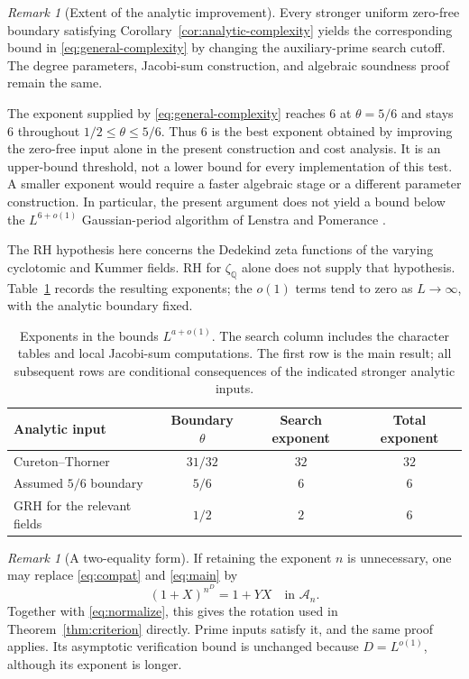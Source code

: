 \documentclass[11pt]{article}
\theoremstyle{definition}
\theoremstyle{remark}
\newtheorem{remark}[theorem]{Remark}
\newcommand{\Q}{\mathbb Q}
\newcommand{\A}{\mathcal A}
\begin{document}
\begin{remark}[Extent of the analytic improvement]\label{rem:analytic-limit}
Every stronger uniform zero-free boundary satisfying
Corollary~\ref{cor:analytic-complexity} yields the corresponding
bound in \eqref{eq:general-complexity} by changing the
auxiliary-prime search cutoff. The degree parameters, Jacobi-sum
construction, and algebraic soundness proof remain the same.

The exponent supplied by \eqref{eq:general-complexity} reaches $6$
at $\theta=5/6$ and stays $6$ throughout $1/2\le\theta\le5/6$.
Thus $6$ is the best exponent obtained by improving the zero-free
input alone in the present construction and cost analysis. It is
an upper-bound threshold, not a lower bound for every implementation
of this test. A smaller exponent would require a faster algebraic
stage or a different parameter construction. In particular, the
present argument does not yield a bound below the
$L^{6+o(1)}$ Gaussian-period algorithm of Lenstra and Pomerance
\cite{lenstra-pomerance}.

The RH hypothesis here concerns the Dedekind zeta functions of
the varying cyclotomic and Kummer fields. RH for $\zeta_{\Q}$
alone does not supply that hypothesis. Table~\ref{tab:analytic}
records the resulting exponents; the $o(1)$ terms tend to zero as
$L\to\infty$, with the analytic boundary fixed.
\end{remark}

\begin{table}[htbp]
\centering
\small
\begin{tabular}{@{}lccc@{}}
\toprule
Analytic input & Boundary $\theta$ & Search exponent & Total exponent \\
\midrule
Cureton--Thorner \cite{cureton-thorner} & $31/32$ & $32$ & $32$ \\
Assumed $5/6$ boundary & $5/6$ & $6$ & $6$ \\
GRH for the relevant fields & $1/2$ & $2$ & $6$ \\
\bottomrule
\end{tabular}
\caption{Exponents in the bounds $L^{a+o(1)}$. The search column
includes the character tables and local Jacobi-sum computations.
The first row is the main result; all subsequent rows are conditional
consequences of the indicated stronger analytic inputs.}
\label{tab:analytic}
\end{table}

\begin{remark}[A two-equality form]
If retaining the exponent $n$ is unnecessary, one may replace
\eqref{eq:compat} and \eqref{eq:main} by
\[
 (1+X)^{n^D}=1+YX\quad\text{in }\A_n.
\]
Together with \eqref{eq:normalize}, this gives the rotation used
in Theorem~\ref{thm:criterion} directly. Prime inputs satisfy it,
and the same proof applies. Its asymptotic verification bound is
unchanged because $D=L^{o(1)}$, although its exponent is longer.
\end{remark}
\end{document}
